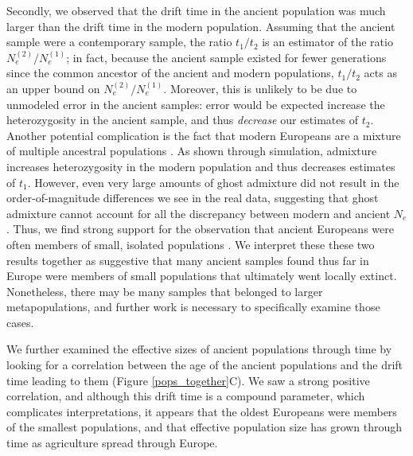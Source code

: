 \documentclass[11pt, oneside]{article}   	%
\begin{document}
Secondly, we observed that the drift time in the ancient population was much larger than the drift time in the modern population. Assuming that the ancient sample were a contemporary sample, the ratio $t_1/t_2$ is an estimator of the ratio $N_e^{(2)}/N_e^{(1)}$; in fact, because the ancient sample existed for fewer generations since the common ancestor of the ancient and modern populations, $t_1/t_2$ acts as an upper bound on $N_e^{(2)}/N_e^{(1)}$. Moreover, this is unlikely to be due to unmodeled error in the ancient samples: error would be expected increase the heterozygosity in the ancient sample, and thus \emph{decrease} our estimates of $t_2$. Another potential complication is the fact that modern Europeans are a mixture of multiple ancestral populations \citep{lazaridis2014ancient, haak2015massive}. As shown through simulation, admixture increases heterozygosity in the modern population and thus decreases estimates of $t_1$. However, even very large amounts of ghost admixture did not result in the order-of-magnitude differences we see in the real data, suggesting that ghost admixture cannot account for all the discrepancy between modern and ancient $N_e$. Thus, we find strong support for the observation that ancient Europeans were often members of small, isolated populations \citep{skoglund2014genomic}. We interpret these these two results together as suggestive that many ancient samples found thus far in Europe were members of small populations that ultimately went locally extinct. Nonetheless, there may be many samples that belonged to larger metapopulations, and further work is necessary to specifically examine those cases.

We further examined the effective sizes of ancient populations through time by looking for a correlation between the age of the ancient populations and the drift time leading to them (Figure \ref{pops_together}C). We saw a strong positive correlation, and although this drift time is a compound parameter, which complicates interpretations, it appears that the oldest Europeans were members of the smallest populations, and that effective population size has grown through time as agriculture spread through Europe.
\end{document}
